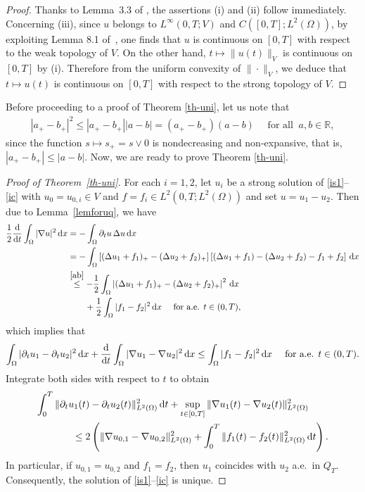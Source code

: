 \documentclass[reqno,10pt]{amsart}
\begin{document}
\begin{proof}
Thanks to Lemma~3.3 of \cite{Bre73}, the assertions (i) and (ii) follow
 immediately. Concerning (iii), since $u$ belongs to $L^\infty(0,T;V)$
 and $C([0,T];L^2(\Omega))$, by exploiting Lemma 8.1 of~\cite{LM}, one
 finds that $u$ is continuous on $[0,T]$ with respect to the weak
 topology of $V$. On the other hand, $t \mapsto \|u(t)\|_V$ is continuous on
 $[0,T]$ by (i). Therefore from the uniform convexity of $\|\cdot\|_V$,
 we deduce that $t \mapsto u(t)$ is continuous on $[0,T]$ with respect
 to the strong topology of $V$.
\end{proof}

Before proceeding to a proof of Theorem \ref{th-uni}, let us note that
\begin{align}\label{ab}
|a_+-b_+|^2\le |a_+-b_+||a-b| = (a_+-b_+)(a-b)
\quad
\mbox{ for all } \ a,b\in {{\mathbb R}},
\end{align}
since the function $s \mapsto s_+ = s \vee 0$ is nondecreasing and 
non-expansive, that is, $|a_+-b_+|\le |a-b|$.
Now, we are ready to prove Theorem \ref{th-uni}.

\begin{proof}[Proof of Theorem~\ref{th-uni}]
For each $i = 1,2$, let $u_i$ be a strong solution of \eqref{is1}--\eqref{ic}
 with $u_0 = u_{0,i} \in V$ and $f = f_i \in L^2(0,T;L^2(\Omega))$ and
 set $u = u_1 - u_2$.
Then due to Lemma~\ref{lemforuq}, we have
\begin{align*}
\dfrac 12 \dfrac{\text{\rm d}}{{\text{\rm d}} t}
\int_\Omega |\nabla u|^2 \, {\text{\rm d}} x
&= - \int_\Omega \partial_t u \, \Delta u \,{\text{\rm d}} x\\
&= - \int_\Omega \left[ (\Delta u_1+f_1)_+-(\Delta u_2+f_2)_+ \right]
\left[ (\Delta u_1+f_1)-(\Delta u_2+f_2) - f_1 + f_2 \right] \,{\text{\rm d}} x\\
&\stackrel{\eqref{ab}}{\le} - \dfrac 1 2 \int_\Omega \left|
(\Delta u_1+f_1)_+-(\Delta u_2+f_2)_+ \right|^2 \,{\text{\rm d}} x \\
&\qquad + \dfrac 1 2 \int_\Omega |f_1 - f_2|^2 \, {\text{\rm d}} x
\quad \mbox{ for a.e. } t\in (0,T),
\end{align*}
which implies that 
$$
\int_\Omega |\partial_t u_1 - \partial_t u_2|^2 \, {\text{\rm d}} x
+ \dfrac{\text{\rm d}}{{\text{\rm d}} t} \int_\Omega |\nabla u_1 - \nabla u_2|^2 \, {\text{\rm d}} x
\leq \int_\Omega |f_1 - f_2|^2 \, {\text{\rm d}} x
\quad \mbox{ for a.e. } t\in (0,T).
$$
Integrate both sides with respect to $t$ to obtain
\begin{align}
\int^T_0 \|\partial_t u_1(t)-\partial_t u_2(t)\|_{L^2(\Omega)}^2 \, {\text{\rm d}} t
+ \sup_{t \in [0,T]} \|\nabla u_1(t)-\nabla u_2(t)\|_{L^2(\Omega)}^2
\qquad \nonumber \\
\leq 2 \left( \|\nabla u_{0,1}-\nabla u_{0,2}\|_{L^2(\Omega)}^2
+ \int^T_0 \|f_1(t)-f_2(t)\|_{L^2(\Omega)}^2 \, {\text{\rm d}} t \right).\label{conti-dep}
\end{align}
In particular, if $u_{0,1} = u_{0,2}$ and $f_1 = f_2$, then $u_1$
 coincides with $u_2$ a.e.~in $Q_T$.
Consequently, the solution of \eqref{is1}--\eqref{ic} is unique.
\end{proof}
\end{document}
